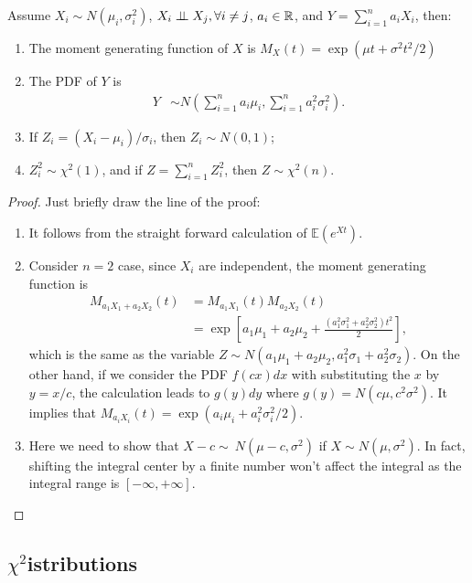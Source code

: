 \begin{theorem} 
Assume $X_i\sim N(\mu_i,\sigma_i^2)$, $X_i\perp\!\!\!\perp X_j,\forall i\ne j$, $a_i\in\mathbb{R}$, and $Y=\sum_{i=1}^na_iX_i$, then:
	\begin{enumerate}
		\item The moment generating function of $X$ is $M_X(t)=\exp(\mu t+\sigma^2t^2/2)$
		\item The PDF of $Y$ is
			\begin{equation}
			\begin{aligned}
			Y &\sim N\left(\sum_{i=1}^na_i\mu_i,\sum_{i=1}^na^2_i\sigma_i^2\right).
			\end{aligned}
			\end{equation}
		\item If $Z_i=(X_i-\mu_i)/\sigma_i$, then $Z_i\sim N(0,1)$;
		\item $Z^2_i\sim \chi^2(1)$, and if $Z=\sum_{i=1}^nZ_i^2$, then $Z\sim \chi^2(n)$.
	\end{enumerate}
\end{theorem}
\begin{proof} Just briefly draw the line of the proof:
	\begin{enumerate}
		\item It follows from the straight forward calculation of $\mathbb{E}(e^{Xt})$.
		\item Consider $n=2$ case, since $X_i$ are independent, the moment generating function is
		\begin{equation*}
		\begin{aligned}
		M_{a_1X_1+a_2X_2}(t)&=M_{a_1X_1}(t)M_{a_2X_2}(t)\\
		&=\exp\left[a_1\mu_1+a_2\mu_2+\frac{(a_1^2\sigma_1^2+a_2^2\sigma_2^2)t^2}{2}\right],
		\end{aligned}
		\end{equation*}
		which is the same as the variable $Z\sim N(a_1\mu_1+a_2\mu_2,a_1^2\sigma_1+a_2^2\sigma_2)$. On the other hand, if we consider the PDF $f(cx)dx$ with substituting the $x$ by $y=x/c$, the calculation leads to $g(y)dy$ where $g(y)=N(c\mu,c^2\sigma^2)$. It implies that $M_{a_iX_i}(t)=\exp(a_i\mu_i+a_i^2\sigma^2_i/2)$.
		\item Here we need to show that $X-c\sim~N(\mu-c,\sigma^2)$ if $X\sim N(\mu,\sigma^2)$. In fact, shifting the integral center by a finite number won't affect the integral as the integral range is $[-\infty,+\infty]$.
	\end{enumerate}
\end{proof}


\subsection{\texorpdfstring{$\chi^2$} distributions}


